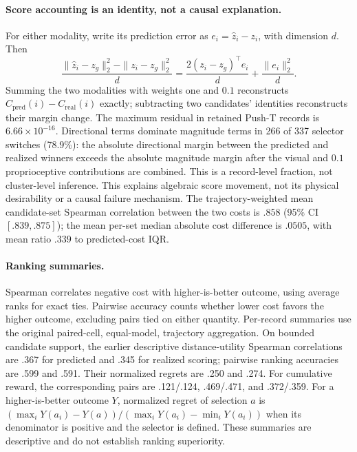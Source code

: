 \paragraph{Score accounting is an identity, not a causal explanation.}
For either modality, write its prediction error as $e_i=\hat z_i-z_i$, with
dimension $d$. Then
\begin{equation}
 \frac{\|\hat z_i-z_g\|_2^2-\|z_i-z_g\|_2^2}{d}
 =\frac{2(z_i-z_g)^\top e_i}{d}+\frac{\|e_i\|_2^2}{d}.
 \label{eq:identity}
\end{equation}
Summing the two modalities with weights one and $0.1$ reconstructs
$C_{\mathrm{pred}}(i)-C_{\mathrm{real}}(i)$ exactly; subtracting two candidates'
identities reconstructs their margin change. The maximum residual in retained
Push-T records is $6.66\times10^{-16}$. Directional terms dominate magnitude
terms in 266 of 337 selector switches (78.9\%): the absolute directional
margin between the predicted and realized winners exceeds the absolute
magnitude margin after the visual and $0.1$ proprioceptive contributions are
combined. This is a record-level fraction, not cluster-level inference.
This explains algebraic score
movement, not its physical desirability or a causal failure mechanism.
The trajectory-weighted mean candidate-set Spearman correlation between the
two costs is $.858$ (95\% CI $[.839,.875]$); the mean per-set median absolute
cost difference is $.0505$, with mean ratio $.339$ to predicted-cost IQR.

\paragraph{Ranking summaries.}
Spearman correlates negative cost with higher-is-better outcome, using average
ranks for exact ties. Pairwise accuracy counts whether lower cost favors the
higher outcome, excluding pairs tied on either quantity. Per-record summaries
use the original paired-cell, equal-model, trajectory aggregation.
On bounded candidate support, the earlier descriptive distance-utility
Spearman correlations are .367 for predicted and .345 for realized scoring;
pairwise ranking accuracies are .599 and .591. Their normalized regrets are
.250 and .274. For cumulative reward, the corresponding pairs are .121/.124,
.469/.471, and .372/.359. For a higher-is-better outcome $Y$, normalized
regret of selection $a$ is
$(\max_iY(a_i)-Y(a))/(\max_iY(a_i)-\min_iY(a_i))$ when its denominator is
positive and the selector is defined. These summaries are descriptive and
do not establish ranking superiority.

